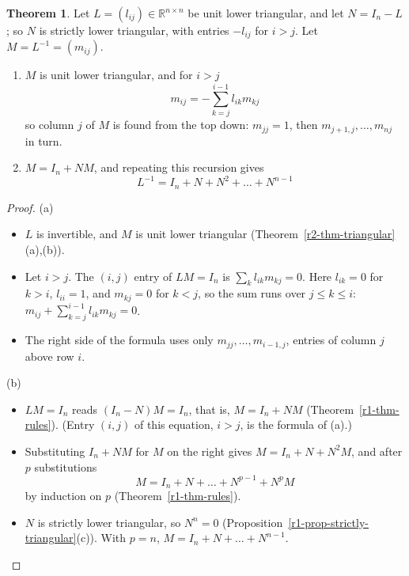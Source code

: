 \documentclass[12pt]{article}
\newcommand{\R}{\mathbb R}
\theoremstyle{definition}
\newtheorem{theorem}{Theorem}
\begin{document}
\begin{theorem}\label{r2-thm-unit-lower-inverse}
Let \(L=(l_{ij})\in\R^{n\times n}\) be unit lower triangular, and let \(N=I_n-L\); so \(N\) is strictly lower
triangular, with entries \(-l_{ij}\) for \(i>j\). Let \(M=L^{-1}=(m_{ij})\).
\begin{enumerate}
\item \(M\) is unit lower triangular, and for \(i>j\)
\[
m_{ij}=-\sum_{k=j}^{i-1}l_{ik}m_{kj}
\]
so column \(j\) of \(M\) is found from the top down: \(m_{jj}=1\), then \(m_{j+1,j},\dots,m_{nj}\) in turn.
\item \(M=I_n+NM\), and repeating this recursion gives
\[
L^{-1}=I_n+N+N^2+\dots+N^{n-1}
\]
\end{enumerate}
\end{theorem}
\begin{proof}
(a)
\begin{itemize}
\item \(L\) is invertible, and \(M\) is unit lower triangular (Theorem~\ref{r2-thm-triangular}(a),(b)).
\item Let \(i>j\). The \((i,j)\) entry of \(LM=I_n\) is \(\sum_kl_{ik}m_{kj}=0\). Here \(l_{ik}=0\) for \(k>i\),
\(l_{ii}=1\), and \(m_{kj}=0\) for \(k<j\), so the sum runs over \(j\leqslant k\leqslant i\):
\(m_{ij}+\sum_{k=j}^{i-1}l_{ik}m_{kj}=0\).
\item The right side of the formula uses only \(m_{jj},\dots,m_{i-1,j}\), entries of column \(j\) above row \(i\).
\end{itemize}
(b)
\begin{itemize}
\item \(LM=I_n\) reads \((I_n-N)M=I_n\), that is, \(M=I_n+NM\) (Theorem~\ref{r1-thm-rules}). (Entry \((i,j)\) of
this equation, \(i>j\), is the formula of (a).)
\item Substituting \(I_n+NM\) for \(M\) on the right gives \(M=I_n+N+N^2M\), and after \(p\) substitutions
\[
M=I_n+N+\dots+N^{p-1}+N^pM
\]
by induction on \(p\) (Theorem~\ref{r1-thm-rules}).
\item \(N\) is strictly lower triangular, so \(N^n=0\) (Proposition~\ref{r1-prop-strictly-triangular}(c)). With
\(p=n\), \(M=I_n+N+\dots+N^{n-1}\).\qedhere
\end{itemize}
\end{proof}
\end{document}
